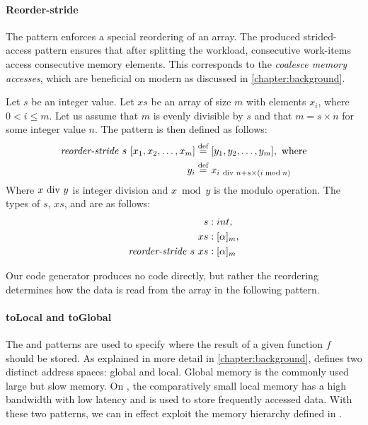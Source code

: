 \paragraph{Reorder-stride}
The \reorderStride pattern enforces a special reordering of an array.
The produced strided-access pattern ensures that after splitting the workload, consecutive work-items access consecutive memory elements.
This corresponds to the \emph{coalesce memory accesses}, which are beneficial on modern \GPUs as discussed in \autoref{chapter:background}.
\begin{definition}
  \label{definition:pattern:reorderStride}
  Let $s$ be an integer value.
  Let $xs$ be an array of size $m$ with elements $x_i$, where $0 < i \leq m$.
  Let us assume that $m$ is evenly divisible by $s$ and that $m = s\times n$ for some integer value $n$.
  The \reorderStride pattern is then defined as follows:
  \begin{align*}
    \text{\textit{reorder-stride}}\ s\ [x_1, x_2, \dots, x_m] &\stackrel{\textrm{\scriptsize def}}{=} [y_1, y_2, \dots, y_m], \text{ where}\\
    y_i &\stackrel{\textrm{\scriptsize def}}{=} x_{i\ \text{\normalfont div } n + s \times (i \bmod{n})}
  \end{align*}
  Where $x\ \text{\normalfont div}\ y$ is integer division and $x \bmod{y}$ is the modulo operation.
  The types of $s$, $xs$, and \reorderStride are as follows:
  \begin{align*}
    s &: int,\\
    xs &: [\alpha]_m,\\
    \text{\textit{reorder-stride}}\ s\ xs &: [\alpha]_m
  \end{align*}
\end{definition}

Our code generator produces no code directly, but rather the reordering determines how the data is read from the array in the following pattern.

{}


\paragraph{{\footnotesize to}Local and {\footnotesize to}Global}
The \toLocal and \toGlobal patterns are used to specify where the result of a given function $f$ should be stored.
As explained in more detail in \autoref{chapter:background}, \OpenCL defines two distinct address spaces: global and local.
Global memory is the commonly used large but slow memory.
On \GPUs, the comparatively small local memory has a high bandwidth with low latency and is used to store frequently accessed data.
With these two patterns, we can in effect exploit the memory hierarchy defined in \OpenCL.

